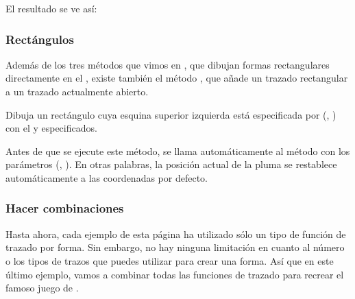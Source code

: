 El resultado se ve así:

\begin{center}
\end{center}

\vspace{10mm} %
\subsubsection{Rectángulos}

Además de los tres métodos que vimos en , que dibujan formas rectangulares directamente en el , existe también el método , que añade un trazado rectangular a un trazado actualmente abierto.

\begin{description}
	 Dibuja un rectángulo cuya esquina superior izquierda está especificada por (, ) con el  y  especificados.
\end{description}
\vspace{5mm} %

Antes de que se ejecute este método, se llama automáticamente al método  con los parámetros (, ). En otras palabras, la posición actual de la pluma se restablece automáticamente a las coordenadas por defecto.

\newpage %
\subsubsection{Hacer combinaciones}

Hasta ahora, cada ejemplo de esta página ha utilizado sólo un tipo de función de trazado por forma. Sin embargo, no hay ninguna limitación en cuanto al número o los tipos de trazos que puedes utilizar para crear una forma. Así que en este último ejemplo, vamos a combinar todas las funciones de trazado para recrear el famoso juego de .

